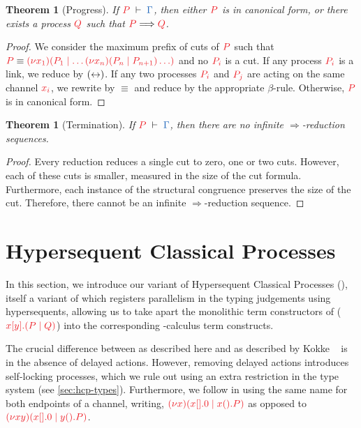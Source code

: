 \documentclass[submission,copyright,creativecommons]{eptcs}
\newtheorem{theorem}[lemma]{Theorem}
\begin{document}
\begin{theorem}[Progress]\label{thm:cp-progress}
  If $\seq[P]{\Gamma}$, then either $\tm{P}$ is in canonical form, or there exists a process $\tm{Q}$ such that $\tm{P}\Longrightarrow\tm{Q}$.
\end{theorem} 
\begin{proof}
  We consider the maximum prefix of cuts of $\tm{P}$ such that $\tm{P} \equiv \tm{\cpCut{x_1}{P_1}{\dots\cpCut{x_n}{P_n}{P_{n+1}}\dots}}$ and no $\tm{P_i}$ is a cut. If any process $\tm{P_i}$ is a link, we reduce by $({\leftrightarrow})$. If any two processes $\tm{P_i}$ and $\tm{P_j}$ are acting on the same channel $\tm{x_i}$, we rewrite by $\equiv$ and reduce by the appropriate $\beta$-rule. Otherwise, $\tm{P}$ is in canonical form.
\end{proof}
\begin{theorem}[Termination]\label{thm:cp-termination}
  If $\seq[P]{\Gamma}$, then there are no infinite $\Longrightarrow$-reduction sequences.
\end{theorem} 
\begin{proof}
  Every reduction reduces a single cut to zero, one or two cuts. However, each of these cuts is smaller, measured in the size of the cut formula. Furthermore, each instance of the structural congruence preserves the size of the cut. Therefore, there cannot be an infinite $\Longrightarrow$-reduction sequence.
\end{proof}

\section{Hypersequent Classical Processes}
\label{sec:hcp}

In this section, we introduce our variant of Hypersequent Classical Processes (\hcp), itself a variant of \cp which registers parallelism in the typing judgements using hypersequents, allowing us to take apart the monolithic term constructors of \cp (\eg $\tm{\cpSend{x}{y}{P}{Q}}$) into the corresponding \textpi-calculus term constructs.

The crucial difference between \hcp as described here and \dhcp as described by Kokke \etal~\cite{kokke2019} is in the absence of delayed actions. However, removing delayed actions introduces self-locking processes, which we rule out using an extra restriction in the type system (see \cref{sec:hcp-types}). Furthermore, we follow \cp in using the same name for both endpoints of a channel, writing, \eg $\tm{\cpCut{x}{\cpHalt{x}}{\cpWait{x}{P}}}$ as opposed to $\tm{\cpCut{xy}{\cpHalt{x}}{\cpWait{y}{P}}}$.
\end{document}
